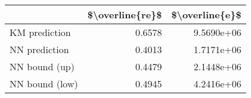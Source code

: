 \begin{tabular}{lrr}
\toprule
{} &  \$\textbackslash overline\{re\}\$ &  \$\textbackslash overline\{e\}\$ \\
\midrule
KM prediction  &           0.6578 &      9.5690e+06 \\
NN prediction  &           0.4013 &      1.7171e+06 \\
NN bound (up)  &           0.4479 &      2.1448e+06 \\
NN bound (low) &           0.4945 &      4.2416e+06 \\
\bottomrule
\end{tabular}
